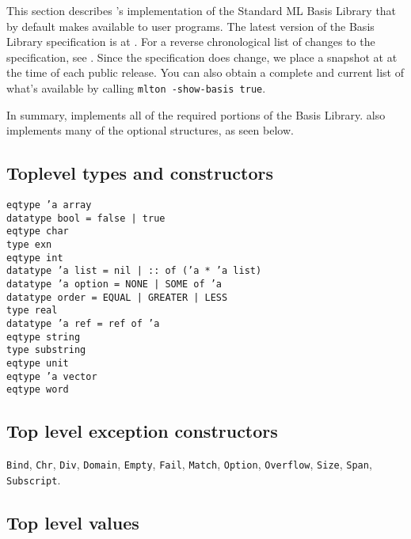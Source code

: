 %
This section describes {\mlton}'s implementation of the Standard ML
Basis Library that by default {\mlton} makes available to user
programs.  The latest version of the Basis Library specification is at
.  For a reverse chronological
list of changes to the specification, see
.  Since the
specification does change, we place a snapshot at
 at the time of each {\mlton} public release.
You can also obtain a complete and current list of what's available by
calling {\tt mlton -show-basis true}.

In summary, {\mlton} implements all of the required portions of the
Basis Library.  {\mlton} also implements many of the optional
structures, as seen below.
%
\subsection{Toplevel types and constructors}
{
\tt eqtype 'a array\\
\tt datatype bool = false | true\\
\tt eqtype char\\
\tt type exn\\
\tt eqtype int\\
\tt datatype 'a list = nil | :: of ('a * 'a list)\\
\tt datatype 'a option = NONE | SOME of 'a\\
\tt datatype order = EQUAL | GREATER | LESS\\
\tt type real\\
\tt datatype 'a ref = ref of 'a\\
\tt eqtype string\\
\tt type substring\\
\tt eqtype unit\\
\tt eqtype 'a vector\\
\tt eqtype word\\
}
%
\subsection{Top level exception constructors}
{\tt Bind},
{\tt Chr},
{\tt Div},
{\tt Domain},
{\tt Empty},
{\tt Fail},
{\tt Match},
{\tt Option},
{\tt Overflow},
{\tt Size},
{\tt Span},
{\tt Subscript}.
%
\subsection{Top level values}

